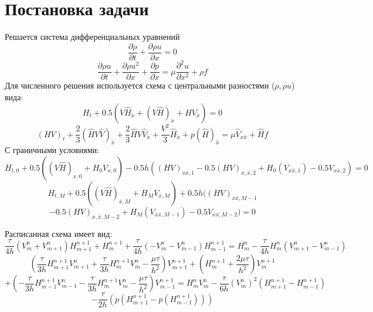 \documentclass[11pt]{extarticle}
\begin{document}
	\section {Постановка задачи}
	Решается система дифференциальных уравнений
	\begin{equation}
	   \frac{\partial \rho}{\partial t} + \frac{\partial \rho u}{\partial x} = 0 
    \end{equation}
	\begin{equation}
		\frac{\partial \rho u}{\partial t} + \frac{\partial \rho u^{2}}{\partial x} + \frac{\partial p}{\partial x} = \mu \frac{\partial^{2} u}{\partial x^{2}} + \rho f
	\end{equation}
	Для численного решения используется схема с центральными разностями ($\rho, \rho u$) вида:
	\begin{equation}
		H_{t} + 0.5 (V  \hat{H}_{\mathring{x}} + (V \hat{H})_{\mathring{x}} + H V_{\mathring{x}}) = 0
	\end{equation}
	\begin{equation}
		(HV)_{t} + \frac{2}{3}(\hat{H}V\hat{V})_{\mathring{x}} + \frac{2}{3}\hat{H}V\hat{V}_{\mathring{x}} + \frac{V^{2}}{3}\hat{H}_{\mathring{x}} + p(\hat{H})_{\mathring{x}} = \mu \hat{V}_{x\bar{x}} + \hat{H}f
	\end{equation}
	С граничными условиями:
	\begin{equation}
		H_{t,0} + 0.5((V\hat{H})_{x, 0} + H_{0}V_{x, 0}) - 0.5h((HV)_{x\bar{x}, 1} - 0.5(HV)_{x,\bar{x}, 2} + H_{0}(V_{x\bar{x}, 1}) - 0.5V_{x\bar{x}, 2}) = 0
	\end{equation}
	\begin{equation*}
		H_{t,M} + 0.5((V\hat{H})_{\bar{x}, M} + H_{M}V_{\bar{x}, M}) + 0.5h((HV)_{x\bar{x}, M - 1}
	\end{equation*}
	\begin{equation}
		 - 	0.5(HV)_{x,\bar{x}, M - 2} + H_{M}(V_{x\bar{x}, M - 1}) - 0.5V_{x\bar{x}, M -  2}) = 0
	\end{equation}

	Расписанная схема имеет вид:
	\begin{equation}
		\frac{\tau}{4h}(V_{m}^{n} + V_{m + 1}^{n})H_{m + 1}^{n+1} + H_{m}^{n + 1} + \frac{\tau}{4h}(-V_{m}^{n} - V_{m - 1}^{n})H_{m - 1}^{n + 1} = H_{m}^{n} - \frac{\tau}{4h}H_{m}^{n} (V_{m + 1}^{n} - V_{m - 1}^{n})
	\end{equation}	
	\begin{equation*}
		(\frac{\tau}{3h}H_{m + 1}^{n + 1}V_{m + 1}^{n} + \frac{\tau}{3h}H_{m}^{n + 1}V_{m}^{n} - \frac{\mu\tau}{h^{2}})V_{m + 1}^{n + 1} + (H_{m}^{n + 1} + \frac{2\mu\tau}{h^{2}})V_{m}^{n + 1}
	\end{equation*}
	\begin{equation*}
		  + (-\frac{\tau}{3h}H_{m - 1}^{n + 1}V_{m - 1}^{n} - \frac{\tau}{3h}H_{m}^{n + 1}V_{m}^{n} - \frac{\mu\tau}{h^{2}})V_{m - 1}^{n + 1} = H_{m}^{n}V_{m}^{n} - \frac{\tau}{6h}(V_{m}^{n})^{2}(H_{m + 1}^{n + 1} - H_{m - 1}^{n + 1})
	\end{equation*}
	\begin{equation}
		   - \frac{\tau}{2h}(p(H_{m + 1}^{n + 1} - p(H_{m - 1}^{n + 1})))
	\end{equation}
	
\end{document}
